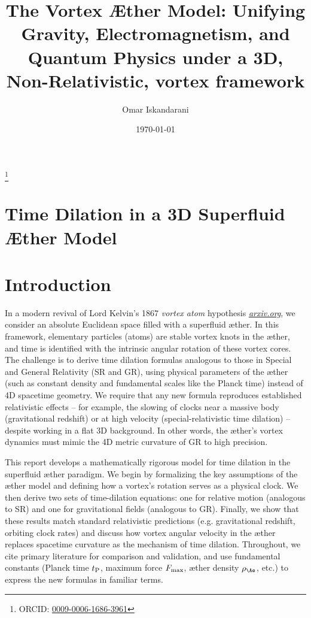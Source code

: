 \documentclass[aps,preprint,superscriptaddress]{revtex4}
\begin{document}
    \author{Omar Iskandarani}
    \title{The Vortex Æther Model: Unifying Gravity, Electromagnetism, and Quantum Physics under a 3D, Non-Relativistic, vortex framework}
    \date{\today}
    \thanks{ORCID: \href{https://orcid.org/0009-0006-1686-3961}{0009-0006-1686-3961}}




    \section*{Time Dilation in a 3D Superfluid Æther Model}

    \section*{Introduction}

    In a modern revival of Lord Kelvin’s 1867 \textit{vortex atom} hypothesis
    \href{https://arxiv.org/pdf/2012.07395#:~:text=Thomson%20,on%20the%20right%20path%20when}{\textit{arxiv.org}}, we consider an absolute Euclidean space filled with a superfluid æther. In this framework, elementary particles (atoms) are stable vortex knots in the æther, and time is identified with the intrinsic angular rotation of these vortex cores. The challenge is to derive time dilation formulas analogous to those in Special and General Relativity (SR and GR), using physical parameters of the æther (such as constant density and fundamental scales like the Planck time) instead of 4D spacetime geometry. We require that any new formula reproduces established relativistic effects – for example, the slowing of clocks near a massive body (gravitational redshift) or at high velocity (special-relativistic time dilation) – despite working in a flat 3D background. In other words, the æther’s vortex dynamics must mimic the 4D metric curvature of GR to high precision.

    This report develops a mathematically rigorous model for time dilation in the superfluid æther paradigm. We begin by formalizing the key assumptions of the æther model and defining how a vortex’s rotation serves as a physical clock. We then derive two sets of time-dilation equations: one for relative motion (analogous to SR) and one for gravitational fields (analogous to GR). Finally, we show that these results match standard relativistic predictions (e.g. gravitational redshift, orbiting clock rates) and discuss how vortex angular velocity in the æther replaces spacetime curvature as the mechanism of time dilation. Throughout, we cite primary literature for comparison and validation, and use fundamental constants (Planck time $t_{\rm P}$, maximum force $F_{\rm max}$, æther density $\rho_{\Ae}$, etc.) to express the new formulas in familiar terms.
\end{document}
